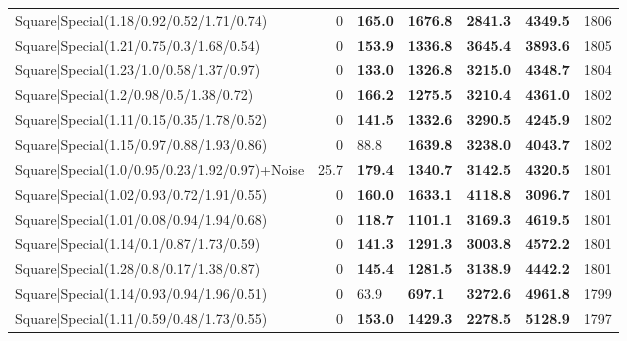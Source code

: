 \begin{tabular}{lrllllr}
 Square|Special(1.18/0.92/0.52/1.71/0.74)                      &             0   & \textbf{165.0} & \textbf{1676.8} & \textbf{2841.3} & \textbf{4349.5} &         1806 \\
 Square|Special(1.21/0.75/0.3/1.68/0.54)                       &             0   & \textbf{153.9} & \textbf{1336.8} & \textbf{3645.4} & \textbf{3893.6} &         1805 \\
 Square|Special(1.23/1.0/0.58/1.37/0.97)                       &             0   & \textbf{133.0} & \textbf{1326.8} & \textbf{3215.0} & \textbf{4348.7} &         1804 \\
 Square|Special(1.2/0.98/0.5/1.38/0.72)                        &             0   & \textbf{166.2} & \textbf{1275.5} & \textbf{3210.4} & \textbf{4361.0} &         1802 \\
 Square|Special(1.11/0.15/0.35/1.78/0.52)                      &             0   & \textbf{141.5} & \textbf{1332.6} & \textbf{3290.5} & \textbf{4245.9} &         1802 \\
 Square|Special(1.15/0.97/0.88/1.93/0.86)                      &             0   & 88.8           & \textbf{1639.8} & \textbf{3238.0} & \textbf{4043.7} &         1802 \\
 Square|Special(1.0/0.95/0.23/1.92/0.97)+Noise                 &            25.7 & \textbf{179.4} & \textbf{1340.7} & \textbf{3142.5} & \textbf{4320.5} &         1801 \\
 Square|Special(1.02/0.93/0.72/1.91/0.55)                      &             0   & \textbf{160.0} & \textbf{1633.1} & \textbf{4118.8} & \textbf{3096.7} &         1801 \\
 Square|Special(1.01/0.08/0.94/1.94/0.68)                      &             0   & \textbf{118.7} & \textbf{1101.1} & \textbf{3169.3} & \textbf{4619.5} &         1801 \\
 Square|Special(1.14/0.1/0.87/1.73/0.59)                       &             0   & \textbf{141.3} & \textbf{1291.3} & \textbf{3003.8} & \textbf{4572.2} &         1801 \\
 Square|Special(1.28/0.8/0.17/1.38/0.87)                       &             0   & \textbf{145.4} & \textbf{1281.5} & \textbf{3138.9} & \textbf{4442.2} &         1801 \\
 Square|Special(1.14/0.93/0.94/1.96/0.51)                      &             0   & 63.9           & \textbf{697.1}  & \textbf{3272.6} & \textbf{4961.8} &         1799 \\
 Square|Special(1.11/0.59/0.48/1.73/0.55)                      &             0   & \textbf{153.0} & \textbf{1429.3} & \textbf{2278.5} & \textbf{5128.9} &         1797 \\

\end{tabular}
